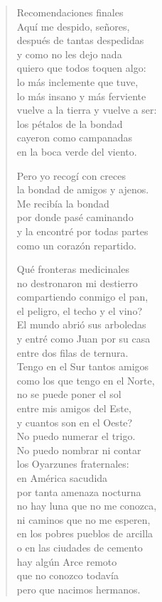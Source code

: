 \documentclass[12pt]{article}
\begin{document}
\begin{verse}
Recomendaciones finales\\
Aquí me despido, señores,\\
después de tantas despedidas\\
y como no les dejo nada\\
quiero que todos toquen algo:\\
lo más inclemente que tuve,\\
lo más insano y más ferviente\\
vuelve a la tierra y vuelve a ser:\\
los pétalos de la bondad\\
cayeron como campanadas\\
en la boca verde del viento.  

Pero yo recogí con creces\\
la bondad de amigos y ajenos.\\
Me recibía la bondad\\
por donde pasé caminando\\
y la encontré por todas partes\\
como un corazón repartido.  

Qué fronteras medicinales\\
no destronaron mi destierro\\
compartiendo conmigo el pan,\\
el peligro, el techo y el vino?\\
El mundo abrió sus arboledas\\
y entré como Juan por su casa\\
entre dos filas de ternura.\\
Tengo en el Sur tantos amigos\\
como los que tengo en el Norte,\\
no se puede poner el sol\\
entre mis amigos del Este,\\
y cuantos son en el Oeste?\\
No puedo numerar el trigo.\\
No puedo nombrar ni contar\\
los Oyarzunes fraternales:\\
en América sacudida\\
por tanta amenaza nocturna\\
no hay luna que no me conozca,\\
ni caminos que no me esperen,\\
en los pobres pueblos de arcilla\\
o en las ciudades de cemento\\
hay algún Arce remoto\\
que no conozco todavía\\
pero que nacimos hermanos.  


\end{verse}
\end{document}
